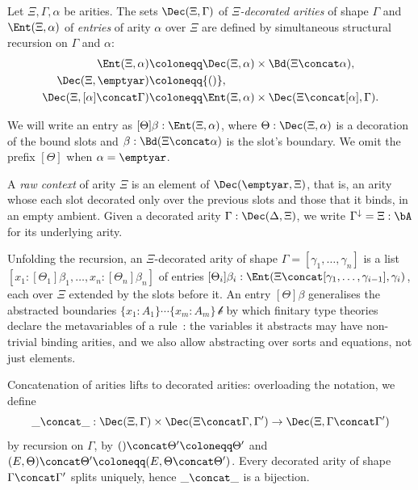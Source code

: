 \begin{definition}\label{def:decorated-arities}
    Let $\Xi, \Gamma, \alpha$ be arities. The sets $\Dec(\Xi, \Gamma)$ of \emph{$\Xi$-decorated arities} of shape $\Gamma$ and $\Ent(\Xi, \alpha)$ of \emph{entries} of arity $\alpha$ over $\Xi$ are defined by simultaneous structural recursion on $\Gamma$ and $\alpha$:
    \begin{align*}
        \Ent(\Xi, \alpha) &\coloneqq \Dec(\Xi, \alpha) \times \Bd(\Xi \concat \alpha),\\
        \Dec(\Xi, \emptyar) &\coloneqq \{()\},\\
        \Dec(\Xi, [\alpha] \concat \Gamma) &\coloneqq \Ent(\Xi, \alpha) \times \Dec(\Xi \concat [\alpha], \Gamma).
    \end{align*}

    We will write an entry as $[\Theta]\beta : \Ent(\Xi,\alpha)$, where $\Theta : \Dec(\Xi, \alpha)$ is a decoration of the bound slots and $\beta : \Bd(\Xi \concat \alpha)$ is the slot's boundary. We omit the prefix $[\Theta]$ when $\alpha = \emptyar$.
    
    A \emph{raw context} of arity $\Xi$ is an element of $\Dec(\emptyar, \Xi)$, that is, an arity whose each slot decorated only over the previous slots and those that it binds, in an 
    empty ambient. Given a decorated arity $\Gamma : \Dec(\Delta, \Xi)$, we write $\Gamma^{\downarrow} = \Xi : \bA$ for its underlying arity.
\end{definition}

\begin{remark}
    Unfolding the recursion, an $\Xi$-decorated arity of shape $\Gamma = [\gamma_1, \ldots, \gamma_n]$ is a list $[x_1 : [\Theta_1]\beta_1, \ldots, x_n : [\Theta_n]\beta_n]$ of entries $[\Theta_i]\beta_i : \Ent(\Xi \concat [\gamma_1, \ldots, \gamma_{i-1}], \gamma_i)$, each over $\Xi$ extended by the slots before it.
    An entry $[\Theta]\beta$ generalises the abstracted boundaries $\{x_1 : A_1\} \cdots \{x_m : A_m\}\, \mathscr{b}$ by which finitary type theories declare the metavariables of a rule~\cite[\S2.1]{HaselwarterBauer2023}: the variables it abstracts may have non-trivial binding arities, and we also allow abstracting over sorts and equations, not just elements.
\end{remark}

\begin{remark}\label{rem:concatenation}
    Concatenation of arities lifts to decorated arities: overloading the notation, we define 
    \[
    \_ \concat \_ : \Dec(\Xi, \Gamma) \times \Dec(\Xi \concat \Gamma, \Gamma') \to \Dec(\Xi, \Gamma \concat \Gamma')
    \]
    by recursion on $\Gamma$, by $() \concat \Theta' \coloneqq \Theta'$ and $(E, \Theta) \concat \Theta' \coloneqq (E, \Theta \concat \Theta')$. Every decorated arity of shape $\Gamma \concat \Gamma'$ splits uniquely, hence $\_ \concat \_$ is a bijection.
\end{remark}

